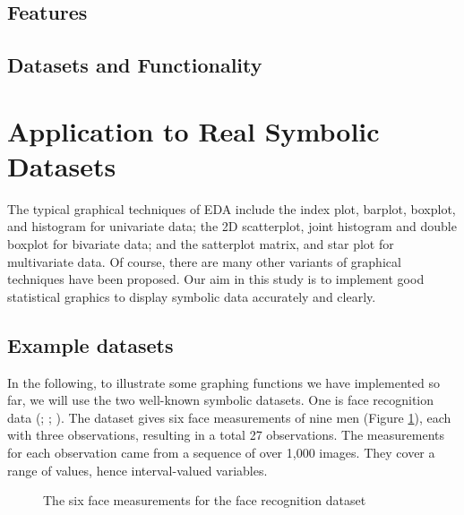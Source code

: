 \documentclass[article]{jss}
\begin{document}
\subsection{Features}

\subsection{Datasets and Functionality}




\section{Application to Real Symbolic Datasets}

The typical graphical techniques of EDA include the index plot, barplot, boxplot, and histogram for univariate data; the 2D scatterplot, joint histogram and double boxplot for bivariate data; and the satterplot matrix, and star plot for multivariate data. Of course, there are many other variants of graphical techniques have been proposed. Our aim in this study is to implement good statistical graphics to display symbolic data accurately and clearly. 

\subsection{Example datasets}

In the following, to illustrate some graphing functions we have implemented so far, we will use the two well-known symbolic datasets. One is face recognition data (\cite{leroy:1996}; \cite{douzal:2011}; \cite{le:2012}). The dataset gives six face measurements of nine men (Figure \ref{fig:face}), each with three observations, resulting in a total 27 observations. The measurements for each observation came from a sequence of over 1,000 images. They cover a range of values, hence interval-valued variables. 

\begin{figure}[htbp]
\centering
{}
\caption{\label{fig:face} The six face measurements for the face recognition dataset}
\end{figure}
\end{document}

